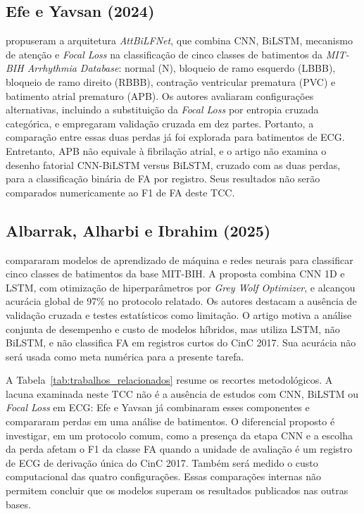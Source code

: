 \documentclass[
    12pt,                %
    openright,           %
    oneside,             %
    a4paper,             %
    english,             %
    brazil               %
]{abntex2}
\begin{document}
\subsection{Efe e Yavsan (2024)}
\label{subsec:trab_efe}

 propuseram a arquitetura \textit{AttBiLFNet}, que combina CNN, BiLSTM, mecanismo de atenção e \textit{Focal Loss} na classificação de cinco classes de batimentos da \textit{MIT-BIH Arrhythmia Database}: normal (N), bloqueio de ramo esquerdo (LBBB), bloqueio de ramo direito (RBBB), contração ventricular prematura (PVC) e batimento atrial prematuro (APB). Os autores avaliaram configurações alternativas, incluindo a substituição da \textit{Focal Loss} por entropia cruzada categórica, e empregaram validação cruzada em dez partes. Portanto, a comparação entre essas duas perdas já foi explorada para batimentos de ECG. Entretanto, APB não equivale à fibrilação atrial, e o artigo não examina o desenho fatorial CNN-BiLSTM versus BiLSTM, cruzado com as duas perdas, para a classificação binária de FA por registro. Seus resultados não serão comparados numericamente ao F1 de FA deste TCC.

\subsection{Albarrak, Alharbi e Ibrahim (2025)}
\label{subsec:trab_albarrak}

 compararam modelos de aprendizado de máquina e redes neurais para classificar cinco classes de batimentos da base MIT-BIH. A proposta combina CNN 1D e LSTM, com otimização de hiperparâmetros por \textit{Grey Wolf Optimizer}, e alcançou acurácia global de 97\% no protocolo relatado. Os autores destacam a ausência de validação cruzada e testes estatísticos como limitação. O artigo motiva a análise conjunta de desempenho e custo de modelos híbridos, mas utiliza LSTM, não BiLSTM, e não classifica FA em registros curtos do CinC 2017. Sua acurácia não será usada como meta numérica para a presente tarefa.

A Tabela~\ref{tab:trabalhos_relacionados} resume os recortes metodológicos. A lacuna examinada neste TCC não é a ausência de estudos com CNN, BiLSTM ou \textit{Focal Loss} em ECG: Efe e Yavsan já combinaram esses componentes e compararam perdas em uma análise de batimentos. O diferencial proposto é investigar, em um protocolo comum, como a presença da etapa CNN e a escolha da perda afetam o F1 da classe FA quando a unidade de avaliação é um registro de ECG de derivação única do CinC 2017. Também será medido o custo computacional das quatro configurações. Essas comparações internas não permitem concluir que os modelos superam os resultados publicados nas outras bases.
\end{document}
